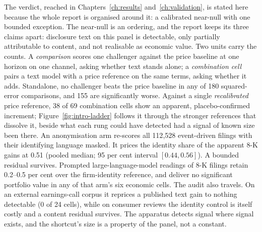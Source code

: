 The verdict, reached in Chapters~\ref{ch:results} and~\ref{ch:validation}, is stated here because the whole report is organised around it: a calibrated near-null with one bounded exception. The near-null is an ordering, and the report keeps its three claims apart: disclosure text on this panel is detectable, only partially attributable to content, and not realisable as economic value. Two units carry the counts. A \emph{comparison} scores one challenger against the price baseline at one horizon on one channel, asking whether text stands alone; a \emph{combination cell} pairs a text model with a price reference on the same terms, asking whether it adds. Standalone, no challenger beats the price baseline in any of 180 squared-error comparisons, and 155 are significantly worse. %
Against a single \emph{recalibrated} price reference, 38 of 69 combination cells show an apparent, placebo-confirmed increment; Figure~\ref{fig:intro-ladder} follows it through the stronger references that dissolve it, beside what each rung could have detected had a signal of known size been there. %
An anonymisation arm re-scores all 112{,}528 event-driven filings with their identifying language masked. It prices the identity share of the apparent 8-K gains at 0.51 (pooled median; 95 per cent interval $[0.44, 0.56]$). %
A bounded residual survives. Prompted large-language-model readings of 8-K filings retain 0.2--0.5 per cent over the firm-identity reference, %
and deliver no significant portfolio value in any of that arm's six economic cells. %
The audit also travels. On an external earnings-call corpus it reprices a published text gain to nothing detectable (0 of 24 cells), %
while on consumer reviews the identity control is itself costly and a content residual survives. %
The apparatus detects signal where signal exists, and the shortcut's size is a property of the panel, not a constant.

